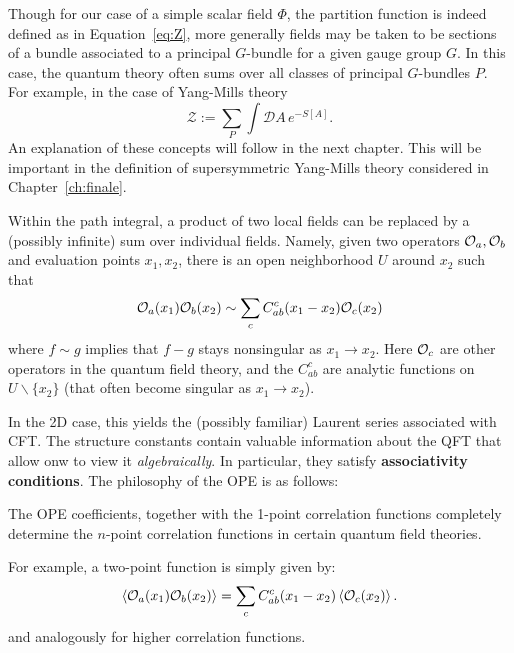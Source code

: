 		
		\begin{remark}
			Though for our case of a simple scalar field $\Phi$, the partition function is indeed defined as in Equation~\eqref{eq:Z}, more generally fields may be taken to be sections of a bundle associated to a principal $G$-bundle for a given gauge group $G$. In this case, the quantum theory often sums over all classes of principal $G$-bundles $P$. For example, in the case of Yang-Mills theory
			\begin{equation}
				\mathcal Z := \sum_{P} \int \mathcal DA \, e^{- S[A]}.
			\end{equation}
			An explanation of these concepts will follow in the next chapter. This will be important in the definition of supersymmetric Yang-Mills theory considered in Chapter~\ref{ch:finale}.
		\end{remark}
		

		\begin{phys}
			 Within the path integral, a product of two local fields can be replaced by a (possibly infinite) sum over individual fields. Namely, given two operators $\mathcal{O}_a, \mathcal{O}_b$ and evaluation points $x_1, x_2$, there is an open neighborhood $U$ around $x_2$ such that
			\begin{equation}
				\mathcal{O}_a (x_1) \mathcal{O}_b(x_2) \sim \sum_c C_{ab}^c(x_1-x_2) \mathcal{O}_c(x_2)
			\end{equation}
			where $f \sim g$ implies that $f - g$ stays nonsingular as $x_1 \to x_2$.
		Here $\mathcal{O}_c$ are other operators in the quantum field theory, and the $C_{ab}^c$ are analytic functions on $U \backslash \{ x_2 \}$ (that often become singular as $x_1 \to x_2$). 
		\end{phys}
	
		In the 2D case, this yields the (possibly familiar) Laurent series associated with CFT. The structure constants contain valuable information about the QFT that allow onw to view it \emph{algebraically}. In particular, they satisfy \textbf{associativity conditions}. The philosophy of the OPE is as follows: %
		\begin{idea}
			The OPE coefficients, together with the 1-point correlation functions completely determine the $n$-point correlation functions in certain quantum field theories. 
		\end{idea}
	\noindent 	For example, a two-point function is simply given by:
		\begin{equation}
			\left< \mathcal{O}_a(x_1) \mathcal{O}_b(x_2) \right> = \sum_c C^c_{ab}(x_1 - x_2) \left< \mathcal O_c (x_2) \right>.
		\end{equation}
		and analogously for higher correlation functions. 
	
